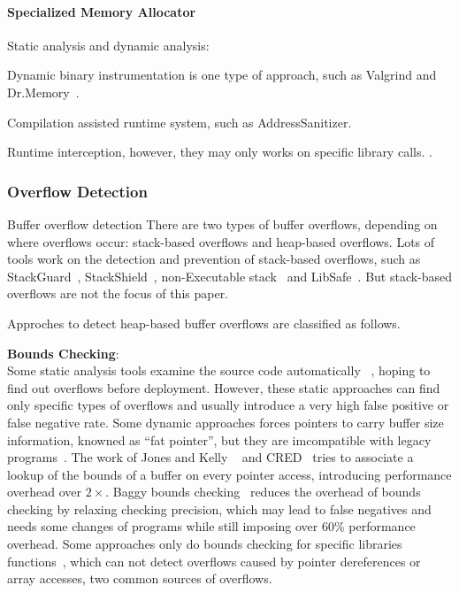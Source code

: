 \paragraph{Specialized Memory Allocator}

Static analysis and dynamic analysis:

Dynamic binary instrumentation is one type of approach, such as Valgrind and Dr.Memory~\cite{overflow:drmemory}.

Compilation assisted runtime system, such as AddressSanitizer.

Runtime interception, however, they may only works on specific library calls. .  
\subsubsection{Overflow Detection}
Buffer overflow detection There are two types of buffer overflows, depending on where overflows occur:
stack-based overflows and heap-based overflows.
Lots of tools work on the detection and prevention of stack-based 
overflows, such as StackGuard~\cite{StackGuard}, StackShield~\cite{StackShield}, 
non-Executable stack~\cite{non-executablestack}
and LibSafe~\cite{Libsafe}. But stack-based overflows are not the focus of this paper. 

Approches to detect heap-based buffer overflows are classified as follows.  

\textbf{Bounds Checking}: \\ 
Some static analysis tools examine the source code automatically 
~\cite{Wagner00afirst, CSSV}, hoping to find out overflows before deployment. 
However, these static
approaches can find only specific types of overflows and usually introduce a
very high false positive or false negative rate. 
Some dynamic approaches forces pointers to carry buffer size information, knowned 
as ``fat pointer'', but they are imcompatible with legacy programs~\cite{Austinpldi1994, Cyclone, CCured}.
The work of Jones and Kelly ~\cite{Jones97backwardscompatiblebounds} and 
CRED~\cite{CRED} tries to associate a lookup of the bounds of a buffer
on every pointer access, introducing performance overhead over $2\times$.
Baggy bounds checking~\cite{overflow:Baggy} reduces the overhead of bounds checking by 
relaxing checking precision, 
which may lead to false negatives and needs some changes of programs while still imposing 
over 60\% performance overhead. 
Some approaches only do bounds checking for specific libraries 
functions~\cite{Libsafe, LibsafePlus, HeapShield}, which can not detect overflows caused by 
pointer dereferences or array accesses, two common sources of overflows.   

